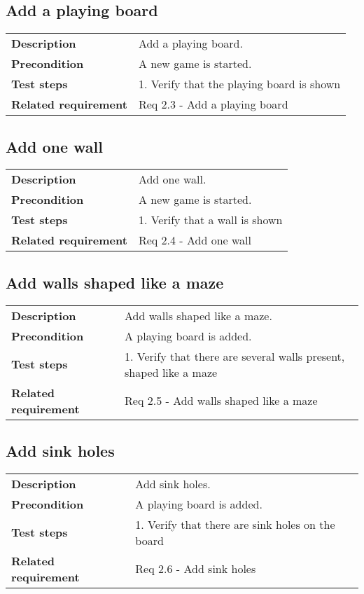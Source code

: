 \documentclass[a4paper,titlepage]{article}
\begin{document}
\subsection{Add a playing board}
\begin{tabularx}{\textwidth}{lX}
	\textbf{Description}	&
		Add a playing board.\\
	\textbf{Precondition}	&
		A new game is started.\\
	\textbf{Test steps}	&
		1. Verify that the playing board is shown\\
	\textbf{Related requirement}	&
		Req 2.3 - Add a playing board \\
\end{tabularx}

\subsection{Add one wall}
\begin{tabularx}{\textwidth}{lX}
	\textbf{Description}	&
		Add one wall.\\
	\textbf{Precondition}	&
		A new game is started.\\
	\textbf{Test steps}	&
		1. Verify that a wall is shown\\
	\textbf{Related requirement}	&
		Req 2.4 - Add one wall \\
\end{tabularx}

\subsection{Add walls shaped like a maze}
\begin{tabularx}{\textwidth}{lX}
	\textbf{Description}	&
		Add walls shaped like a maze.\\
	\textbf{Precondition}	&
		A playing board is added.\\
	\textbf{Test steps}	&
		1. Verify that there are several walls present, shaped like a maze\\
	\textbf{Related requirement}	&
		Req 2.5 - Add walls shaped like a maze\\
\end{tabularx}

\subsection{Add sink holes}
\begin{tabularx}{\textwidth}{lX}
	\textbf{Description}	&
		Add sink holes.\\
	\textbf{Precondition}	&
		A playing board is added.\\
	\textbf{Test steps}	&
		1. Verify that there are sink holes on the board\\
	\textbf{Related requirement}	&
		Req 2.6 - Add sink holes\\
\end{tabularx}
\end{document}
